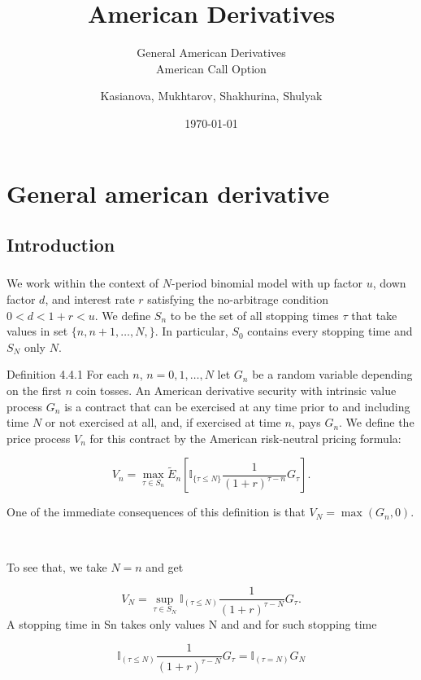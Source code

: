 \documentclass[c, dvipsnames, 8pt]{beamer}
\title[American derivatives]  
{American Derivatives}
\subtitle{General American Derivatives \\  American Call Option
}
\author[]{Kasianova, Mukhtarov, Shakhurina, Shulyak}
\institute[]{Higher School of Economics}
\date{\today}
\begin{document}
	
	
\maketitle

\section{General american derivative}

\subsection{Introduction}


\begin{frame}[shrink=5]

\frametitle{\insertsection} 
\framesubtitle{\insertsubsection} 

We work within the context of $N$-period binomial model with up factor $u$, down factor $d$, and interest rate $r$ satisfying the no-arbitrage condition $0<d<1+r<u$. We define $S_n$ to be the set of all stopping times $\tau$ that take values in set $\{n, n+1,…,N, \}$. In particular, $S_0$ contains every stopping time and $S_N$ only $N$. 

\begin{block}{Definition 4.4.1}
	 For each $n$, $n=0,1,…,N$ let $G_n$ be a random variable depending on the first $n$ coin tosses. An American derivative security with intrinsic value process $G_n$ is a contract that can be exercised at any time prior to and including time $N$ or not exercised at all, and, if exercised at time $n$, pays $G_n$. We define the price process $V_n$ for this contract by the American risk-neutral pricing formula:
	 
	 \begin{equation}\label{e1}
	 V_n = \max_{\tau \in S_n} \tilde{E}_n [\mathbb{I}_{\{\tau \leq N\}} \dfrac{1}{(1+r)^{\tau-n}}G_{\tau}].
	 \end{equation}
	 
	 
	 
\end{block}

One of the immediate consequences of this definition is that
$V_N = \max(G_n, 0).$

\

To see that, we take $N=n$  and get

\begin{equation}\label{key}
V_N = \sup\limits_{{\tau \in S_N}}\mathbb{I}_{(\tau\leq N)} \frac{1}{(1+r)^{\tau-N}}G_\tau.
\end{equation}
A stopping time in Sn takes only values N and  and for such stopping time

\begin{equation}\label{key}
\mathbb{I}_{(\tau\leq N)} \frac{1}{(1+r)^{\tau-N}}G_\tau  = \mathbb{I}_{(\tau = N)}G_N
\end{equation}

\end{frame}
\end{document}
